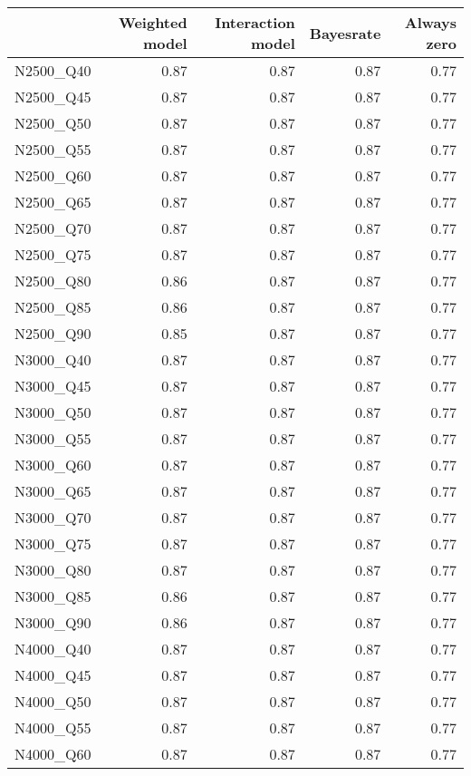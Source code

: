 \begin{table}[ht]
\centering
\begin{tabular}{rrrrr}
  \hline
 & Weighted model & Interaction model & Bayesrate & Always zero \\ 
  \hline
N2500\_Q40 & 0.87 & 0.87 & 0.87 & 0.77 \\ 
  N2500\_Q45 & 0.87 & 0.87 & 0.87 & 0.77 \\ 
  N2500\_Q50 & 0.87 & 0.87 & 0.87 & 0.77 \\ 
  N2500\_Q55 & 0.87 & 0.87 & 0.87 & 0.77 \\ 
  N2500\_Q60 & 0.87 & 0.87 & 0.87 & 0.77 \\ 
  N2500\_Q65 & 0.87 & 0.87 & 0.87 & 0.77 \\ 
  N2500\_Q70 & 0.87 & 0.87 & 0.87 & 0.77 \\ 
  N2500\_Q75 & 0.87 & 0.87 & 0.87 & 0.77 \\ 
  N2500\_Q80 & 0.86 & 0.87 & 0.87 & 0.77 \\ 
  N2500\_Q85 & 0.86 & 0.87 & 0.87 & 0.77 \\ 
  N2500\_Q90 & 0.85 & 0.87 & 0.87 & 0.77 \\ 
  N3000\_Q40 & 0.87 & 0.87 & 0.87 & 0.77 \\ 
  N3000\_Q45 & 0.87 & 0.87 & 0.87 & 0.77 \\ 
  N3000\_Q50 & 0.87 & 0.87 & 0.87 & 0.77 \\ 
  N3000\_Q55 & 0.87 & 0.87 & 0.87 & 0.77 \\ 
  N3000\_Q60 & 0.87 & 0.87 & 0.87 & 0.77 \\ 
  N3000\_Q65 & 0.87 & 0.87 & 0.87 & 0.77 \\ 
  N3000\_Q70 & 0.87 & 0.87 & 0.87 & 0.77 \\ 
  N3000\_Q75 & 0.87 & 0.87 & 0.87 & 0.77 \\ 
  N3000\_Q80 & 0.87 & 0.87 & 0.87 & 0.77 \\ 
  N3000\_Q85 & 0.86 & 0.87 & 0.87 & 0.77 \\ 
  N3000\_Q90 & 0.86 & 0.87 & 0.87 & 0.77 \\ 
  N4000\_Q40 & 0.87 & 0.87 & 0.87 & 0.77 \\ 
  N4000\_Q45 & 0.87 & 0.87 & 0.87 & 0.77 \\ 
  N4000\_Q50 & 0.87 & 0.87 & 0.87 & 0.77 \\ 
  N4000\_Q55 & 0.87 & 0.87 & 0.87 & 0.77 \\ 
  N4000\_Q60 & 0.87 & 0.87 & 0.87 & 0.77 \\ 

\end{tabular}
\end{table}
